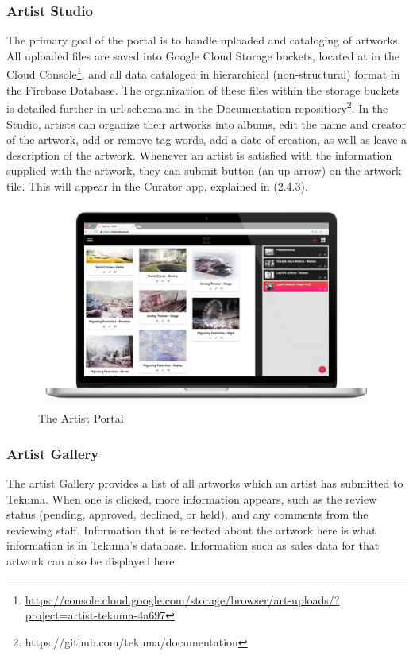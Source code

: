 \documentclass[fontsize=12pt]{scrartcl} %
\begin{document}
\subsubsection{Artist Studio}
The primary goal of the portal is to handle uploaded and cataloging of artworks. All uploaded files are saved into Google Cloud Storage buckets, located at in the Cloud Console\footnote{\url{https://console.cloud.google.com/storage/browser/art-uploads/?project=artist-tekuma-4a697}}, and all data cataloged in hierarchical (non-structural) format in the Firebase Database. The organization of these files within the storage buckets is detailed further in url-schema.md in the Documentation repositiory\footnote{ https://github.com/tekuma/documentation}. In the Studio, artists can organize their artworks into albums, edit the name and creator of the artwork, add or remove tag words, add a date of creation, as well as leave a description of the artwork. Whenever an artist is satisfied with the information supplied with the artwork, they can submit button (an up arrow) on the artwork tile. This will appear in the Curator app, explained in (2.4.3).
\begin{figure}
    \includegraphics[scale=0.2]{./img/artist.jpg}
    \caption{The Artist Portal}
    \label{artist}
\end{figure}

\subsubsection{Artist Gallery}
The artist Gallery provides a list of all artworks which an artist has submitted to Tekuma. When one is clicked, more information appears, such as the review status (pending, approved, declined, or held), and any comments from the reviewing staff. Information that is reflected about the artwork here is what information is in Tekuma's database. Information such as sales data for that artwork can also be displayed here.
\end{document}
